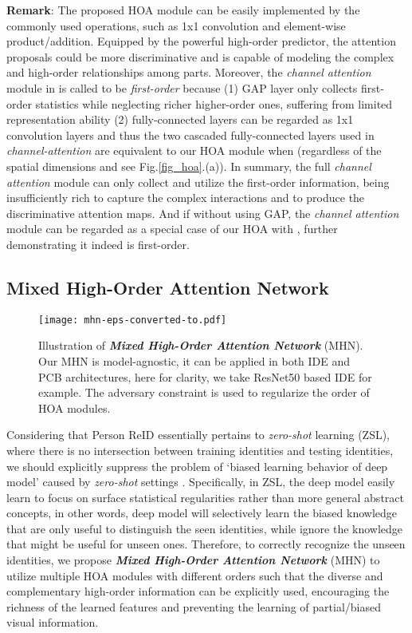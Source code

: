 \documentclass[10pt,twocolumn,letterpaper]{article}
\begin{document}
\textbf{Remark}: The proposed HOA module can be easily implemented by the commonly used operations, such as 1x1 convolution and element-wise product/addition. Equipped by the powerful high-order predictor, the attention proposals could be more discriminative and is capable of modeling the complex and high-order relationships among parts. Moreover, the \emph{channel attention} module in \cite{hu2018squeeze,li2018harmonious} is called to be \emph{first-order} because (1) GAP layer only collects first-order statistics while neglecting richer higher-order ones, suffering from limited representation ability \cite{cimpoi2015deep} (2) fully-connected layers can be regarded as 1x1 convolution layers and thus the two cascaded fully-connected layers used in \emph{channel-attention} \cite{hu2018squeeze} are equivalent to our HOA module when  (regardless of the spatial dimensions and see Fig.\ref{fig_hoa}.(a)). In summary, the full \emph{channel attention} module can only collect and utilize the first-order information, being insufficiently rich to capture the complex interactions and to produce the discriminative attention maps. And if without using GAP, the \emph{channel attention} module can be regarded as a special case of our HOA with , further demonstrating it indeed is first-order.
\subsection{Mixed High-Order Attention Network}\label{sec_mhn}
\begin{figure}[t]
  \centering
\texttt{[image: mhn-eps-converted-to.pdf]}\\
  \caption{Illustration of \textbf{\emph{Mixed High-Order Attention Network}} (MHN). Our MHN is model-agnostic, it can be applied in both IDE \cite{zheng2016person} and PCB \cite{sun2018beyond} architectures, here for clarity, we take ResNet50 \cite{he2016deep} based IDE for example. The adversary constraint is used to regularize the order of HOA modules.}\label{fig_mhn}
  \vspace{-1.5em}
\end{figure}
Considering that Person ReID essentially pertains to \emph{zero-shot} learning (ZSL), where there is no intersection between training identities and testing identities, we should explicitly suppress the problem of `biased learning behavior of deep model' caused by \emph{zero-shot} settings \cite{chen2019energy}. Specifically, in ZSL, the deep model easily learn to focus on surface statistical regularities rather than more general abstract concepts, in other words, deep model will selectively learn the biased knowledge that are only useful to distinguish the seen identities, while ignore the knowledge that might be useful for unseen ones. Therefore, to correctly recognize the unseen identities, we propose \textbf{\emph{Mixed High-Order Attention Network}} (MHN) to utilize multiple HOA modules with different orders such that the diverse and complementary high-order information can be explicitly used, encouraging the richness of the learned features and preventing the learning of partial/biased visual information.
\end{document}
